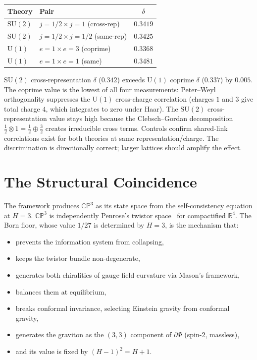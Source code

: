 \documentclass[11pt,a4paper]{article}
\theoremstyle{definition}
\theoremstyle{remark}
\newcommand{\CP}{\mathbb{CP}}
\newcommand{\R}{\mathbb{R}}
\newcommand{\dbar}{\bar{\partial}}
\newcommand{\SU}{\mathrm{SU}}
\begin{document}
\begin{enumerate}[nosep]
\begin{center}
\begin{tabular}{llc}
\toprule
Theory & Pair & $\delta$ \\
\midrule
$\SU(2)$ & $j\!=\!1/2 \times j\!=\!1$ (cross-rep) & $0.3419$ \\
$\SU(2)$ & $j\!=\!1/2 \times j\!=\!1/2$ (same-rep) & $0.3425$ \\
$\mathrm{U}(1)$ & $e\!=\!1 \times e\!=\!3$ (coprime) & $0.3368$ \\
$\mathrm{U}(1)$ & $e\!=\!1 \times e\!=\!1$ (same) & $0.3481$ \\
\bottomrule
\end{tabular}
\end{center}

$\SU(2)$ cross-representation $\delta$ ($0.342$) exceeds $\mathrm{U}(1)$ coprime $\delta$ ($0.337$) by $0.005$. The coprime value is the lowest of all four measurements: Peter--Weyl orthogonality suppresses the $\mathrm{U}(1)$ cross-charge correlation (charges $1$ and $3$ give total charge $4$, which integrates to zero under Haar). The $\SU(2)$ cross-representation value stays high because the Clebsch--Gordan decomposition $\frac{1}{2}\otimes 1=\frac{1}{2}\oplus\frac{3}{2}$ creates irreducible cross terms. Controls confirm shared-link correlations exist for both theories at same representation/charge. The discrimination is directionally correct; larger lattices should amplify the effect.
\end{enumerate}


\section{The Structural Coincidence}\label{sec:coincidence}

The framework produces $\CP^3$ as its state space from the self-consistency equation at $H=3$. $\CP^3$ is independently Penrose's twistor space~\cite{Penrose1967} for compactified $\R^4$. The Born floor, whose value $1/27$ is determined by $H=3$, is the mechanism that:
\begin{itemize}[nosep]
\item prevents the information system from collapsing,
\item keeps the twistor bundle non-degenerate,
\item generates both chiralities of gauge field curvature via Mason's framework,
\item balances them at equilibrium,
\item breaks conformal invariance, selecting Einstein gravity from conformal gravity,
\item generates the graviton as the $(3,3)$ component of $\dbar\Phi$ (spin-$2$, massless),
\item and its value is fixed by $(H-1)^2=H+1$.
\end{itemize}
\end{document}
